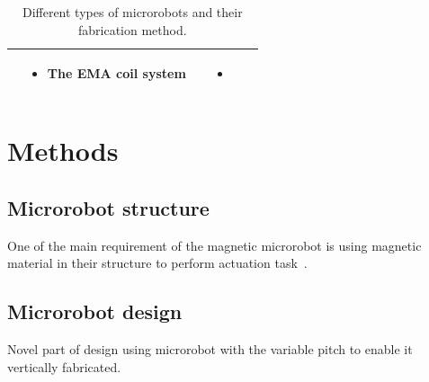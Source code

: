 \documentclass[12pt,a4paper,titlepage]{report}
\begin{document}
\begin{table}[h!]
\begin{tabular}{ c m{2.5cm}  m{4.3cm} m{3cm} m{2cm}}
\begin{minipage}[t]{3cm}
\begin{itemize}
      \end{itemize}
    \end{minipage}
    & 
    \begin{minipage}[t]{4cm}
      \begin{itemize}
        \item The EMA coil system
     
      \end{itemize}
    \end{minipage}
&



	&
	   \begin{itemize}
        \item \citep{ko2012jellyfish}
   
      \end{itemize}
    \\ \hline








  \end{tabular}
  \caption{Different types of microrobots and their fabrication method.}\label{Micro}
\end{table}



\chapter{Methods}

\section{Microrobot structure}

One of the main requirement of the magnetic microrobot is using magnetic material in their structure 
to perform actuation task~\citep{qiu2014noncytotoxic}. 







\section{Microrobot design}

Novel part of design using microrobot with the variable pitch to enable it vertically fabricated.
\end{document}
